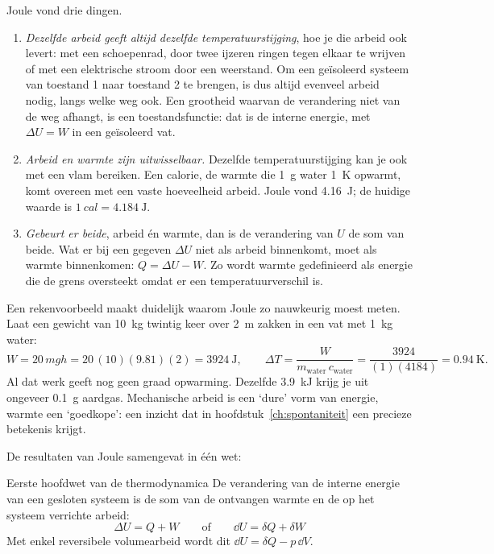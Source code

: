 Joule vond drie dingen.
\begin{enumerate}
\item \emph{Dezelfde arbeid geeft altijd dezelfde temperatuurstijging}, hoe je die arbeid ook levert: met een schoepenrad, door twee ijzeren ringen tegen elkaar te wrijven of met een elektrische stroom door een weerstand. Om een ge\"isoleerd systeem van toestand 1 naar toestand 2 te brengen, is dus altijd evenveel arbeid nodig, langs welke weg ook. Een grootheid waarvan de verandering niet van de weg afhangt, is een toestandsfunctie: dat is de interne energie, met $\Delta U = W$ in een ge\"isoleerd vat.
\item \emph{Arbeid en warmte zijn uitwisselbaar.} Dezelfde temperatuurstijging kan je ook met een vlam bereiken. Een calorie, de warmte die \SI{1}{\gram} water \SI{1}{\kelvin} opwarmt, komt overeen met een vaste hoeveelheid arbeid. Joule vond \SI{4.16}{\joule}; de huidige waarde is $\SI{1}{cal} = \SI{4.184}{\joule}$.
\item \emph{Gebeurt er beide}, arbeid \'en warmte, dan is de verandering van $U$ de som van beide. Wat er bij een gegeven $\Delta U$ niet als arbeid binnenkomt, moet als warmte binnenkomen: $Q = \Delta U - W$. Zo wordt warmte gedefinieerd als energie die de grens oversteekt omdat er een temperatuurverschil is.
\end{enumerate}

Een rekenvoorbeeld maakt duidelijk waarom Joule zo nauwkeurig moest meten. Laat een gewicht van \SI{10}{\kilogram} twintig keer over \SI{2}{\metre} zakken in een vat met \SI{1}{\kilogram} water:
\[
W = 20\,mgh = 20\,(10)(9.81)(2) = \SI{3924}{\joule},
\qquad
\Delta T = \frac{W}{m_\text{water}\,c_\text{water}} = \frac{3924}{(1)(4184)} = \SI{0.94}{\kelvin}.
\]
Al dat werk geeft nog geen graad opwarming. Dezelfde \SI{3.9}{\kilo\joule} krijg je uit ongeveer \SI{0.1}{\gram} aardgas. Mechanische arbeid is een `dure' vorm van energie, warmte een `goedkope': een inzicht dat in hoofdstuk~\ref{ch:spontaniteit} een precieze betekenis krijgt.

De resultaten van Joule samengevat in \'e\'en wet:

\begin{definitie}{Eerste hoofdwet van de thermodynamica}
De verandering van de interne energie van een gesloten systeem is de som van de ontvangen warmte en de op het systeem verrichte arbeid:
\begin{equation}
\boxed{\Delta U = Q + W \qquad\text{of}\qquad \dd U = \delta Q + \delta W}
\end{equation}
Met enkel reversibele volumearbeid wordt dit $\dd U = \delta Q - p\,\dd V$.
\end{definitie}


